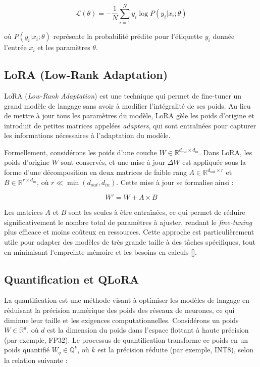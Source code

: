 \documentclass[13pt,a4paper]{article}
\begin{document}
\[
\mathcal{L}(\theta) = -\frac{1}{N} \sum_{i=1}^{N} y_i \log P(y_i | x_i; \theta)
\]

où $P(y_i | x_i; \theta)$ représente la probabilité prédite pour l'étiquette $y_i$ donnée l'entrée $x_i$ et les paramètres $\theta$.

\subsection{LoRA (Low-Rank Adaptation)}

LoRA (\textit{Low-Rank Adaptation}) est une technique qui permet de fine-tuner un grand modèle de langage sans avoir à modifier l'intégralité de ses poids. Au lieu de mettre à jour tous les paramètres du modèle, LoRA gèle les poids d'origine et introduit de petites matrices appelées \textit{adapters}, qui sont entraînées pour capturer les informations nécessaires à l'adaptation du modèle.

Formellement, considérons les poids d'une couche $W \in \mathbb{R}^{d_{out} \times d_{in}}$. Dans LoRA, les poids d'origine $W$ sont conservés, et une mise à jour $\Delta W$ est appliquée sous la forme d'une décomposition en deux matrices de faible rang $A \in \mathbb{R}^{d_{out} \times r}$ et $B \in \mathbb{R}^{r \times d_{in}}$, où $r \ll \min(d_{out}, d_{in})$. Cette mise à jour se formalise ainsi :

\[
W' = W + A \times B
\]

Les matrices $A$ et $B$ sont les seules à être entraînées, ce qui permet de réduire significativement le nombre total de paramètres à ajuster, rendant le \textit{fine-tuning} plus efficace et moins coûteux en ressources. Cette approche est particulièrement utile pour adapter des modèles de très grande taille à des tâches spécifiques, tout en minimisant l'empreinte mémoire et les besoins en calculs [\cite{Hu2021}].


\subsection{Quantification et QLoRA}

La quantification est une méthode visant à optimiser les modèles de langage en réduisant la précision numérique des poids des réseaux de neurones, ce qui diminue leur taille et les exigences computationnelles. Considérons un poids $W \in \mathbb{R}^d$, où $d$ est la dimension du poids dans l'espace flottant à haute précision (par exemple, FP32). Le processus de quantification transforme ce poids en un poids quantifié $W_q \in \mathbb{Q}^k$, où $k$ est la précision réduite (par exemple, INT8), selon la relation suivante :
\end{document}
